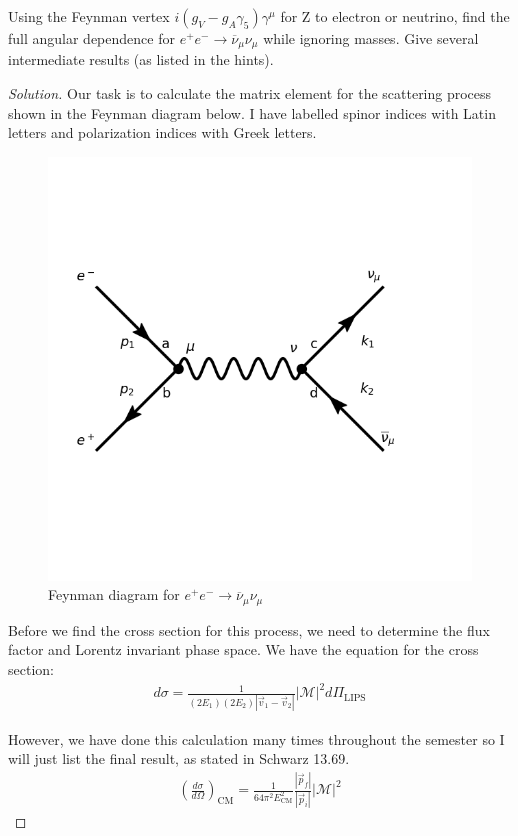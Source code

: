 \documentclass[12pt]{article}
\newenvironment{questionpart}[2][Part]{\begin{trivlist}
\item[\hskip \labelsep \hskip \labelsep {\bfseries (#2)}]}{\end{trivlist}}
\newenvironment{solution}{\begin{proof}[Solution]}{\end{proof}}
\begin{document}
\begin{questionpart}{b}
Using the Feynman vertex $i(g_V-g_A\gamma_5)\gamma^\mu$ for Z to electron or neutrino, find the full angular dependence for $e^+e^-\rightarrow\overline{\nu}_\mu\nu_\mu$ while ignoring masses. Give several intermediate results (as listed in the hints).
\end{questionpart}

\begin{solution}


Our task is to calculate the matrix element for the scattering process shown in the Feynman diagram below. I have labelled spinor indices with Latin letters and polarization indices with Greek letters.

\begin{figure}[h!]
    \centering
    \includegraphics[width=0.7\linewidth]{13_6_feynman_diagram.png}
    \caption{Feynman diagram for $e^+e^-\rightarrow \overline{\nu}_\mu \nu_\mu$}
\end{figure}

\newpage

Before we find the cross section for this process, we need to determine the flux factor and Lorentz invariant phase space. We have the equation for the cross section:
\begin{align*}
    d\sigma=\frac{1}{(2E_1)(2E_2)|\vec{v}_1-\vec{v}_2|}|\mathcal{M}|^2d\Pi_{\text{LIPS}}
\end{align*}

However, we have done this calculation many times throughout the semester so I will just list the final result, as stated in Schwarz 13.69.
\begin{align*}
    \left(\frac{d\sigma}{d\Omega}\right)_\text{CM}=\frac{1}{64\pi^2E_\text{CM}^2}\frac{|\vec{p}_f|}{|\vec{p}_i|}|\mathcal{M}|^2
\end{align*}


\end{solution}
\end{document}
